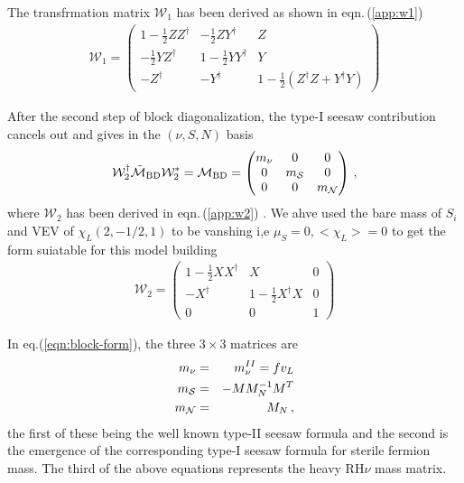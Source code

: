 \documentclass[a4paper,11pt]{article}
\newcommand{\bea}{\begin{eqnarray}}
\newcommand{\eea}{\end{eqnarray}}
\newcommand{\bmt}{\begin{pmatrix}}
\newcommand{\emt}{\end{pmatrix}}
\begin{document}
The transfrmation matrix $\mathcal{W}_1$ has been derived as shown in
eqn.\,(\ref{app:w1})\cite{app:2013,bpn-mkp:2015}
\bea 
\mathcal{W}_1=\bmt
1-\frac{1}{2}ZZ^\dagger & -\frac{1}{2}ZY^\dagger & Z \\
-\frac{1}{2}YZ^\dagger & 1-\frac{1}{2}YY^\dagger & Y \\
-Z^\dagger & -Y^\dagger & 1-\frac{1}{2}(Z^\dagger Z + Y^\dagger Y)
\emt
 \label{app:w1}
\eea

\noindent
After the second step of block 
diagonalization, the type-I seesaw contribution cancels out and gives in the $\left(\nu, S, N \right)$ basis
\begin{eqnarray}
\mathcal{W}^\dagger_2 \tilde{\mathcal{M}}_{\rm \tiny BD} \mathcal{W}^*_2 = \mathcal{M}_{\rm \tiny BD}
= \bmt m_\nu &0&0\\
0&m_{\cal S}&0\\
0&0&m_{\cal N}
\emt\, ,
\label{eqn:block-form}    
\end{eqnarray}
where $\mathcal{W}_2$ has been derived in eqn.\,(\ref{app:w2})
\cite{app:2013,bpn-mkp:2015}. We ahve used the bare mass of $S_i$ and
VEV of $\chi_L(2,-1/2,1)$ to be vanshing i,e $\mu_S=0,<\chi_L>=0$
to  get the form suiatable for this model building
\bea 
\mathcal{W}_2 
=
\bmt 
1-\frac{1}{2}XX^\dagger &X & 0\\
-X^\dagger & 1-\frac{1}{2}X^\dagger X & 0 \\
0 & 0 & 1
\emt
 \label{app:w2}
\eea

In eq.(\ref{eqn:block-form}), the three $3 \times 3$ matrices are 
\bea
m_{\nu} & = & m_{\nu}^{II}=fv_L  \\ 
m_{\cal S}& = &  - M M^{-1}_NM^T  \\ 
m_{\cal N} &= &  M_N \, ,
\label{eq:mass}
\eea
the first of these being the well known type-II seesaw formula and the
second is the emergence of the corresponding type-I seesaw formula for
sterile fermion mass. The third of the above equations represents the
heavy RH$\nu$ mass matrix.
\end{document}

